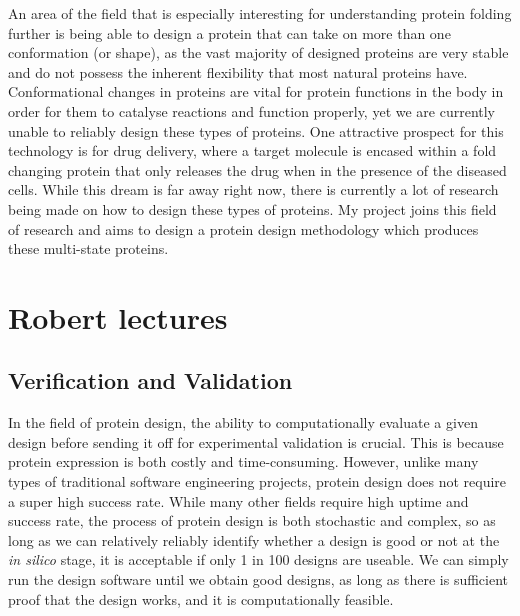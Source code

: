 \documentclass[a4paper, 11pt]{article} %
\begin{document}
An area of the field that is especially interesting for understanding protein folding further is being able to design a protein that can take on more than one conformation (or shape), as the vast majority of designed proteins are very stable and do not possess the inherent flexibility that most natural proteins have\cite*{Baker_2019}. Conformational changes in proteins are vital for protein functions in the body in order for them to catalyse reactions and function properly, yet we are currently unable to reliably design these types of proteins\cite*{Orellana_2019}. One attractive prospect for this technology is for drug delivery, where a target molecule is encased within a fold changing protein that only releases the drug when in the presence of the diseased cells. While this dream is far away right now, there is currently a lot of research being made on how to design these types of proteins. My project joins this field of research and aims to design a protein design methodology which produces these multi-state proteins.



\section*{Robert lectures}

\subsection*{Verification and Validation}

In the field of protein design, the ability to computationally evaluate a given design before sending it off for experimental validation is crucial. This is because protein expression is both costly and time-consuming. However, unlike many types of traditional software engineering projects, protein design does not require a super high success rate. While many other fields require high uptime and success rate, the process of protein design is both stochastic and complex, so as long as we can relatively reliably identify whether a design is good or not at the \textit{in silico} stage, it is acceptable if only 1 in 100 designs are useable. We can simply run the design software until we obtain good designs, as long as there is sufficient proof that the design works, and it is computationally feasible.
\end{document}
